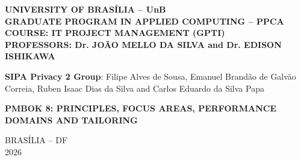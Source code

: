 \documentclass[12pt,a4paper,article,oneside,brazil,english]{abntex2}
\newcommand{\integrantes}{Filipe Alves de Sousa, Emanuel Brandão de Galvão Correia, Ruben Isaac Dias da Silva and Carlos Eduardo da Silva Papa}
\newif\ifavisocapa   \avisocapafalse    %
\begin{document}
\thispagestyle{empty}
\noindent\begin{minipage}[t][0.92\textheight]{\textwidth}
\centering
\SingleSpacing
\textbf{UNIVERSITY OF BRASÍLIA -- UnB\\GRADUATE PROGRAM IN APPLIED COMPUTING -- PPCA\\COURSE: IT PROJECT MANAGEMENT (GPTI)\\PROFESSORS: Dr. JOÃO MELLO DA SILVA and Dr. EDISON ISHIKAWA}

\vspace{1cm}

\textbf{SIPA Privacy 2 Group}: \integrantes

\vspace{3cm}

\textbf{PMBOK 8: PRINCIPLES, FOCUS AREAS, PERFORMANCE DOMAINS AND TAILORING}

\vspace{1.2cm}
\ifavisocapa
\begin{center}\fbox{\parbox{\dimexpr\linewidth-2\fboxsep-2\fboxrule\relax}{\SingleSpacing\small\noindent\textbf{Statement on the use of artificial intelligence.} Generative AI (ChatGPT Astral 6 Sol and Sonnet 5.5, both in high mode) was used to support text editing, formatting, figure creation, and table drafting. AI is not an author: the group is responsible for the content, in line with the COPE position on authorship and AI tools (COPE, 2023).\par\smallskip\noindent COMMITTEE ON PUBLICATION ETHICS (COPE). \textit{Authorship and AI tools: COPE position statement}. 13 Feb. 2023. Available at: \url{https://publicationethics.org/guidance/cope-position/authorship-and-ai-tools}.}}\end{center}
\fi
\vfill

BRASÍLIA -- DF\\2026
\end{minipage}
\clearpage
\end{document}
